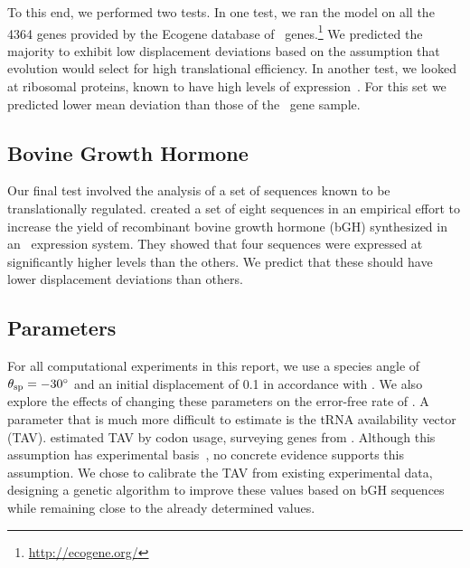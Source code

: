 \documentclass[12pt]{article}
\begin{document}
To this end, we performed two tests. In one test, we ran the model on
all the 4364 genes provided by the Ecogene database of
\ecoli\ genes.\footnote{\url{http://ecogene.org/}}
We predicted the majority to exhibit low
displacement deviations based on the assumption that evolution would select
for high translational efficiency. In another
test, we looked at ribosomal proteins, known to have high levels of
expression~\cite{rpoS:process}. For this set we predicted lower mean
deviation than those of the \ecoli\ gene sample.
	
\subsection{Bovine Growth Hormone}
Our final test involved the analysis of a set of sequences known to 
be translationally regulated.  \citet{schoner:bgh} created a set 
of eight sequences in an empirical effort to increase the yield 
of recombinant bovine growth hormone (bGH) synthesized in an 
\ecoli\ expression system. They
showed that four sequences were expressed 
at significantly higher levels than the others. We predict that 
these should have lower displacement deviations than others.

\subsection{Parameters}
\label{section:parameters}
For all computational experiments in this report, we use a species
angle of $\theta_{\rm{sp}} = -30^\circ$ and an initial displacement of 0.1
in accordance with \citet{lalit:mechanics}.
We also explore the effects of changing these parameters on the
error-free rate of \prfB.
A parameter that is much more difficult to estimate
is the tRNA availability vector (TAV).
\citeauthor{lalit:mechanics} estimated TAV by codon usage, 
surveying genes from \ecoli.
Although this assumption has experimental basis~\cite{ikemura}, 
no concrete evidence supports this assumption.
We chose to calibrate the TAV from existing experimental data, 
designing a genetic algorithm to improve these values based on 
bGH sequences while remaining close 
to the already determined values.
\end{document}
